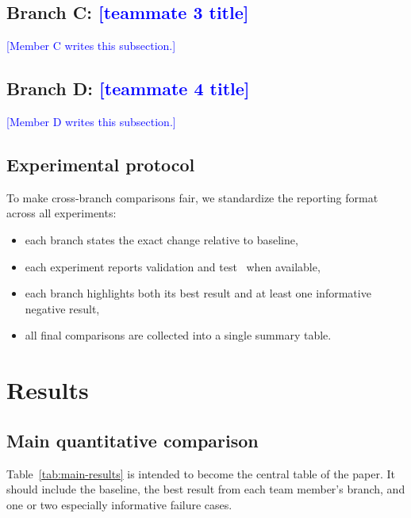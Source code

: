 \documentclass{article}
\newcommand{\cer}{\mathrm{CER}}
\newcommand{\todo}[1]{\textcolor{blue}{[#1]}}
\begin{document}
\subsection{Branch C: \todo{teammate 3 title}}
\label{sec:branchC}
\todo{Member C writes this subsection.}

\subsection{Branch D: \todo{teammate 4 title}}
\label{sec:branchD}
\todo{Member D writes this subsection.}

\subsection{Experimental protocol}
To make cross-branch comparisons fair, we standardize the reporting format across all experiments:
\begin{itemize}[leftmargin=1.2em]
    \item each branch states the exact change relative to baseline,
    \item each experiment reports validation and test \cer\ when available,
    \item each branch highlights both its best result and at least one informative negative result,
    \item all final comparisons are collected into a single summary table.
\end{itemize}

\section{Results}
\label{sec:results}


\subsection{Main quantitative comparison}
Table~\ref{tab:main-results} is intended to become the central table of the paper.
It should include the baseline, the best result from each team member's branch, and one or two especially informative failure cases.
\end{document}
